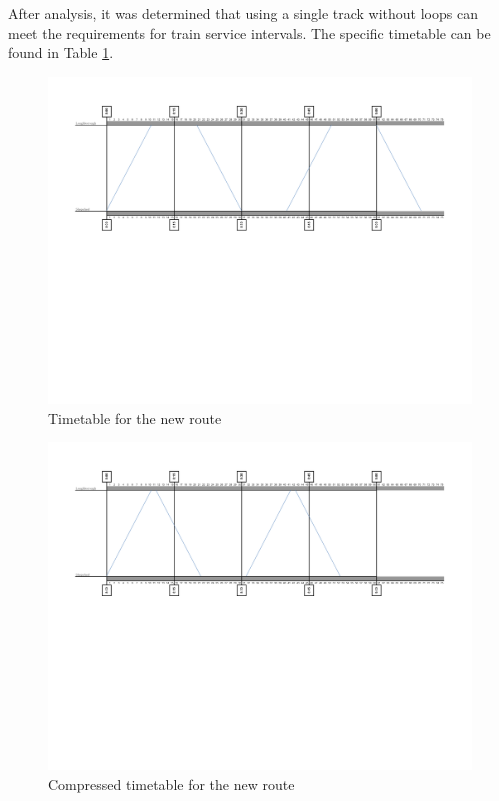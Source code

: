 \documentclass[letterpaper,12pt,leqno]{article}
\begin{document}
After analysis, it was determined that using a single track without loops can meet the requirements for train service intervals. The specific timetable can be found in Table \ref{fig:timetable1}. 

\begin{figure}[H]
    \centering
    \includegraphics[width=1\linewidth]{timetable1.pdf}
    \caption{Timetable for the new route}
    \label{fig:timetable1}
\end{figure}
 \begin{figure}[H]
     \centering
     \includegraphics[width=1\linewidth]{timetable2.pdf}
     \caption{Compressed timetable for the new route}
     \label{fig:timetable2}
 \end{figure}
\end{document}
